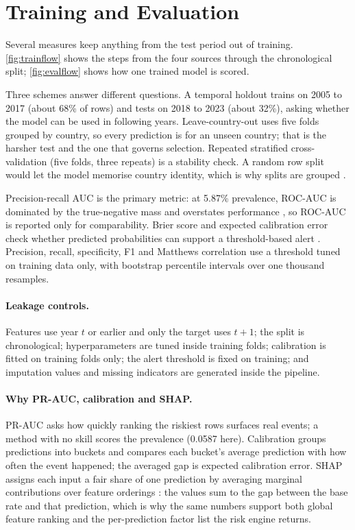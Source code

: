 \documentclass[10pt,openany]{report}
\begin{document}
\section{Training and Evaluation}
\label{sec:train-eval}

Several measures keep anything from the test period out of training. \cref{fig:trainflow}
shows the steps from the four sources through the chronological split; \cref{fig:evalflow}
shows how one trained model is scored.




Three schemes answer different questions. A temporal holdout trains on 2005 to 2017 (about 68\% of
rows) and tests on 2018 to 2023 (about 32\%), asking whether the model can be used in following
years. Leave-country-out uses five folds grouped by country, so every prediction is for an unseen
country; that is the harsher test and the one that governs selection. Repeated stratified
cross-validation (five folds, three repeats) is a stability check. A random row split would let the
model memorise country identity, which is why splits are grouped \cite{roberts2017}.

Precision-recall AUC is the primary metric: at 5.87\% prevalence, ROC-AUC is dominated by the
true-negative mass and overstates performance \cite{saito2015,davis2006}, so ROC-AUC is reported only
for comparability. Brier score and expected calibration error check whether predicted probabilities
can support a threshold-based alert \cite{niculescu2005,huang2020}. Precision, recall, specificity,
F1 and Matthews correlation use a threshold tuned on training data only, with bootstrap percentile
intervals over one thousand resamples.

\paragraph{Leakage controls.}
Features use year $t$ or earlier and only the target uses $t{+}1$; the split is chronological;
hyperparameters are tuned inside training folds; calibration is fitted on training folds only; the
alert threshold is fixed on training; and imputation values and missing indicators are generated
inside the pipeline.

\paragraph{Why PR-AUC, calibration and SHAP.}
PR-AUC asks how quickly ranking the riskiest rows surfaces real events; a method with no skill scores
the prevalence (0.0587 here). Calibration groups predictions into buckets and compares each bucket's
average prediction with how often the event happened; the averaged gap is expected calibration error.
SHAP assigns each input a fair share of one prediction by averaging marginal contributions over
feature orderings \cite{lundberg2017}: the values sum to the gap between the base rate and that
prediction, which is why the same numbers support both global feature ranking and the per-prediction
factor list the risk engine returns.
\end{document}
